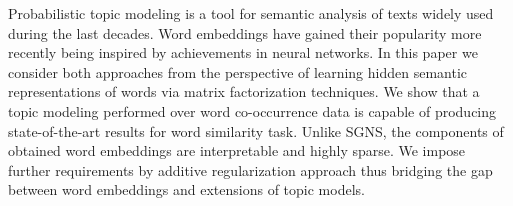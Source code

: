 Probabilistic topic modeling is a tool for semantic analysis of texts widely used during the last decades. Word embeddings have gained their popularity more recently being inspired by achievements in neural networks. In this paper we consider both approaches from the perspective of learning hidden semantic representations of words via matrix factorization techniques. We show that a topic modeling performed over word co-occurrence data is capable of producing state-of-the-art results for word similarity task. Unlike SGNS, the components of obtained word embeddings are interpretable and highly sparse. We impose further requirements by additive regularization approach thus bridging the gap between word embeddings and extensions of topic models.
